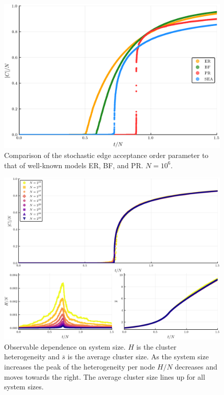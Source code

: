 \begin{figure}[H]
	\centering
	\includegraphics[width=350pt, clip]{images/Network_ER_BF_PR_SEA_1e6_order_param.png}
	\caption{Comparison of the stochastic edge acceptance order parameter to that of well-known models ER, BF, and PR. $N = 10^6$.}
	\label{fig:ER_BF_PR_SEA_transition}
\end{figure}

\begin{figure}[H]
	\centering
	\includegraphics[width=350pt, clip]{images/k_scaling_triple.png}
	\caption{Observable dependence on system size. $H$ is the cluster heterogeneity and $\overline{s}$ is the average cluster size. As the system size increases the peak of the heterogeneity per node $H/N$ decreases and moves towards the right. The average cluster size lines up for all system sizes.}
	\label{fig:k_scaling_triple}
\end{figure}

